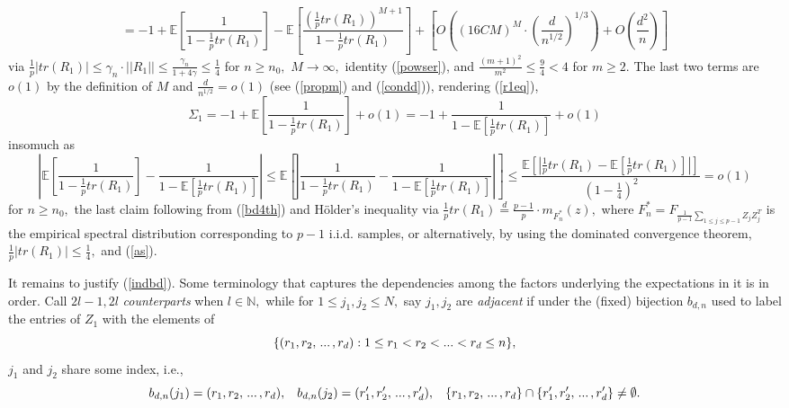 \documentclass{article}
\numberwithin{equation}{section}
\begin{document}
\[=-1+\mathbb{E}[\frac{1}{1-\frac{1}{p}tr(R_1)}]-\mathbb{E}[\frac{(\frac{1}{p}tr(R_1))^{M+1}}{1-\frac{1}{p}tr(R_1)}]+[O((16CM)^{M} \cdot (\frac{d}{n^{1/2}})^{1/3})+O(\frac{d^2}{n})]\]
via \(\frac{1}{p}|tr(R_1)| \leq \gamma_n \cdot ||R_1|| \leq \frac{\gamma_n}{1+4\gamma} \leq \frac{1}{4}\) for \(n \geq n_0,\) \(M \to \infty,\) identity (\ref{powser}), and \(\frac{(m+1)^2}{m^2} \leq \frac{9}{4}<4\) for \(m \geq 2.\) The last two terms are \(o(1)\) by the definition of \(M\) and \(\frac{d}{n^{1/2}}=o(1)\) (see (\ref{propm}) and (\ref{condd})), rendering %
(\ref{r1eq}), %
\[\Sigma_1=-1+\mathbb{E}[\frac{1}{1-\frac{1}{p}tr(R_1)}]+o(1)=-1+\frac{1}{1-\mathbb{E}[\frac{1}{p}tr(R_1)]}+o(1)\]
insomuch as
\[|\mathbb{E}[\frac{1}{1-\frac{1}{p}tr(R_1)}]-\frac{1}{1-\mathbb{E}[\frac{1}{p}tr(R_1)]}| \leq \mathbb{E}[|\frac{1}{1-\frac{1}{p}tr(R_1)}-\frac{1}{1-\mathbb{E}[\frac{1}{p}tr(R_1)]}|] \leq \frac{\mathbb{E}[|\frac{1}{p}tr(R_1)-\mathbb{E}[\frac{1}{p}tr(R_1)]|]}{(1-\frac{1}{4})^2}=o(1)\]
for \(n \geq n_0,\) the last claim following from (\ref{bd4th}) and Hölder's inequality via \(\frac{1}{p}tr(R_1) \overset{d}{=} \frac{p-1}{p} \cdot m_{F^*_{n}}(z),\) where \(F^*_{n}=F_{\frac{1}{p-1}\sum_{1 \leq j \leq p-1}{Z_jZ_j^T}}\) is the empirical spectral distribution corresponding to \(p-1\) i.i.d. samples, or alternatively, by using the dominated convergence theorem, \(\frac{1}{p}|tr(R_1)| \leq \frac{1}{4},\) and (\ref{as}).
\vspace{0.2cm}
\par
It remains to justify (\ref{indbd}). Some terminology that captures the dependencies among the factors underlying the expectations in it is in order. Call \(2l-1,2l\) \textit{counterparts} when \(l \in \mathbb{N},\) while for \(1 \leq j_1,j_2 \leq N,\) say \(j_1,j_2\) are \textit{adjacent} if under the (fixed) bijection \(b_{d,n}\) used to label the entries of \(Z_1\) with the elements of
\[\{(r_1,r_2,\hspace{0.05cm}...\hspace{0.05cm},r_d): 1 \leq r_1<r_2<...<r_d \leq n\},\] 
\(j_1\) and \(j_2\) share some index, i.e.,
\[b_{d,n}(j_1)=(r_1,r_2,\hspace{0.05cm}...\hspace{0.05cm},r_d), \hspace{0.3cm} b_{d,n}(j_2)=(r'_1,r'_2,\hspace{0.05cm}...\hspace{0.05cm},r'_d), \hspace{0.3cm} \{r_1,r_2,\hspace{0.05cm}...\hspace{0.05cm},r_d\} \cap \{r'_1,r'_2,\hspace{0.05cm}...\hspace{0.05cm},r'_d\} \ne \emptyset.\] 
\end{document}
